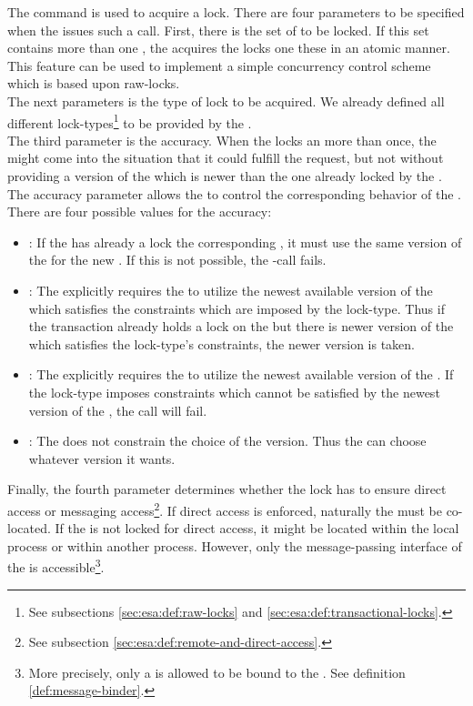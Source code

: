\documentclass[a4paper, 12pt]{book}
\begin{document}
The command \dbaiACQUIRE is used to acquire a lock. There are four
parameters to be specified when the  issues such a
call. First, there is the set of  to be locked. If this
set contains more than one , the \SYNEIGHT acquires
the locks one these  in an atomic manner. This feature
can be used to implement a simple concurrency control scheme which is
based upon raw-locks.\\
%
The next parameters is the type of lock to be acquired. We already
defined all different lock-types\footnote{See subsections
\vref{sec:esa:def:raw-locks} and
\vref{sec:esa:def:transactional-locks}.} to be provided by the
\SYNEIGHT.\\
%
The third parameter is the accuracy. When the  locks an
 more than once, the \SYNEIGHT might come into the
situation that it could fulfill the request, but not without providing
a version of the  which is newer than the one already
locked by the . The accuracy parameter allows the
 to control the corresponding behavior of the
\SYNEIGHT. There are four possible values for the accuracy:
\begin{itemize}
\item \dbaiACCRETAIN: If the  has already a lock the
corresponding , it must use the same version of the
 for the new . If this is not possible, the
\dbaiACQUIRE-call fails. 
\item \dbaiACCRENEWC: The  explicitly requires the
\SYNEIGHT to utilize the newest available version of the
 which satisfies the constraints which are imposed by the
lock-type. Thus if the transaction already holds a lock on the
 but there is newer version of the  which
satisfies the lock-type's constraints, the newer version is taken. 
\item \dbaiACCRENEWUC: The  explicitly requires the
\SYNEIGHT to utilize the newest available version of the
. If the lock-type imposes constraints which cannot be
satisfied by the newest version of the , the call will
fail. 
\item \dbaiACCPOSSSIBLY: The  does not constrain the choice
of the version. Thus the \SYNEIGHT can choose whatever version
it wants. 
\end{itemize}
Finally, the fourth parameter determines whether the lock has to
ensure direct access or messaging access\footnote{See subsection
\vref{sec:esa:def:remote-and-direct-access}.}. If direct access is
enforced, naturally the  must be co-located. If the
 is not locked for direct access, it might be located
within the local process or within another process. However, only the
message-passing interface of the  is
accessible\footnote{More precisely, only a  is
allowed to be bound to the . See definition
\vref{def:message-binder}.}.
\end{document}

